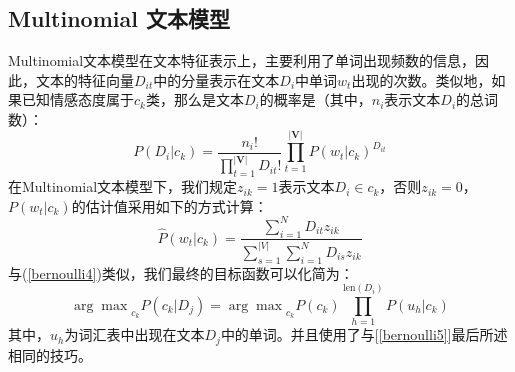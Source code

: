 \documentclass[11pt]{article}
\begin{document}
\subsection{Multinomial 文本模型}
\hspace{1.6em} Multinomial文本模型在文本特征表示上，主要利用了单词出现频数的信息，因此，文本的特征向量$D_{it}$中的分量表示在文本$D_i$中单词$w_t$出现的次数。类似地，如果已知情感态度属于$c_k$类，那么是文本$D_i$的概率是（其中，$n_i$表示文本$D_i$的总词数）：
\begin{equation}\label{multi1}
P(D_{i}|c_k)=\frac{n_i!}{\prod_{t=1}^{|\mathbf{V}|}D_{it}!}\prod_{t=1}^{|\mathbf{V}|} P(w_t|c_k)^{D_{it}}
\end{equation}
\indent 在Multinomial文本模型下，我们规定$z_{ik}=1$表示文本$D_i\in c_k$，否则$z_{ik}=0$，$P(w_t|c_k)$的估计值采用如下的方式计算：
\begin{equation}\label{multi2}
\hat{P}(w_t|c_k)=\frac{\sum_{i=1}^{N}D_{it}z_{ik}}{\sum_{s=1}^{|V|}\sum_{i=1}^{N}D_{is}z_{ik}}
\end{equation}
\indent 与(\ref{bernoulli4})类似，我们最终的目标函数可以化简为：
\begin{equation}
{\arg\!\max}_{c_k} P(c_{k}|D_j)={\arg\!\max}_{c_k}P(c_k)\prod_{h=1}^{\text{len}(D_i)}P(u_h|c_k)
\end{equation}
\indent 其中，$u_h$为词汇表中出现在文本$D_j$中的单词。并且使用了与[\ref{bernoulli5}]最后所述相同的技巧。
\end{document}
